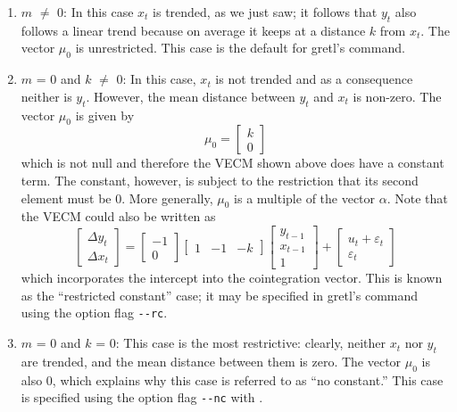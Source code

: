 \begin{enumerate}
\item $m$ $\ne$ 0: In this case $x_t$ is trended, as we just saw; it
  follows that $y_t$ also follows a linear trend because on average it
  keeps at a distance $k$ from $x_t$. The vector
  $\mu_0$ is unrestricted.  This case is the default
  for gretl's  command.
	
\item $m$ = 0 and $k$ $\ne$ 0: In this case, $x_t$ is not trended and
  as a consequence neither is $y_t$. However, the mean distance
  between $y_t$ and $x_t$ is non-zero. The vector
  $\mu_0$ is given by
%	  
  \[
  \mu_0 = \left[ \begin{array}{c} k \\ 0 \end{array} \right]
  \]
%	    
  which is not null and therefore the VECM shown above does have a
  constant term. The constant, however, is subject to the restriction
  that its second element must be 0. More generally,
  $\mu_0$ is a multiple of the vector $\alpha$. Note
  that the VECM could also be written as
%	  
  \[
  \left[ \begin{array}{c} \Delta y_t \\ \Delta x_t \end{array} \right]
  = \left[ \begin{array}{r} -1 \\ 0 \end{array} \right] \left[
    \begin{array}{rrr} 1 & -1 & -k \end{array} \right] \left[
    \begin{array}{c} y_{t-1} \\ x_{t-1} \\ 1 \end{array} \right] +
  \left[ \begin{array}{c} u_t + \varepsilon_t \\ \varepsilon_t
    \end{array} \right]
  \]
%	   
  which incorporates the intercept into the cointegration vector. This
  is known as the ``restricted constant'' case; it may be specified in
  gretl's  command using the option flag \verb+--rc+.
	
\item $m$ = 0 and $k$ = 0: This case is the most restrictive: clearly,
  neither $x_t$ nor $y_t$ are trended, and the mean distance between
  them is zero. The vector $\mu_0$ is also 0, which
  explains why this case is referred to as ``no constant.''  This case
  is specified using the option flag \verb+--nc+ with .
	
\end{enumerate}

